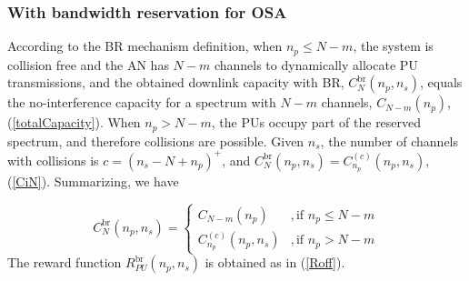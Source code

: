 \subsubsection{With bandwidth reservation for OSA}
According to the BR mechanism definition, when $n_{p}\leq N-m$, the system is collision free and the AN has $N-m$ channels to dynamically allocate PU transmissions, and the obtained downlink capacity with BR, $C_{N}^{\text{br}}\left(n_{p},n_{s}\right)$, equals the no-interference capacity for a spectrum with $N-m$ channels, $C_{N-m}\left(n_{p}\right)$, (\ref{totalCapacity}).
When $n_{p}>N-m$, the PUs occupy part of the reserved spectrum, and therefore collisions are possible. Given $n_{s}$, the number of channels with collisions is $c = \left(n_{s}-N+n_{p}\right)^{+}$,
and $C_{N}^{\text{br}}\left(n_{p},n_{s}\right) = C^{(c)}_{n_{p}}\left(n_{p},n_{s}\right)$, (\ref{CiN}). Summarizing, we have 
 
\begin{equation}\label{expectedCapacity2}
C_{N}^{\text{br}}\left(n_{p},n_{s}\right) =
\begin{cases}
C_{N-m}\left(n_{p}\right) &,\mbox{if }n_{p}\leq N-m\\
C^{(c)}_{n_{p}}\left(n_{p},n_{s}\right) &,\mbox{if }n_{p} > N-m
\end{cases}
\end{equation}
The reward function $R^{\text{br}}_{PU}(n_{p},n_{s})$ is obtained as in (\ref{Roff}).

